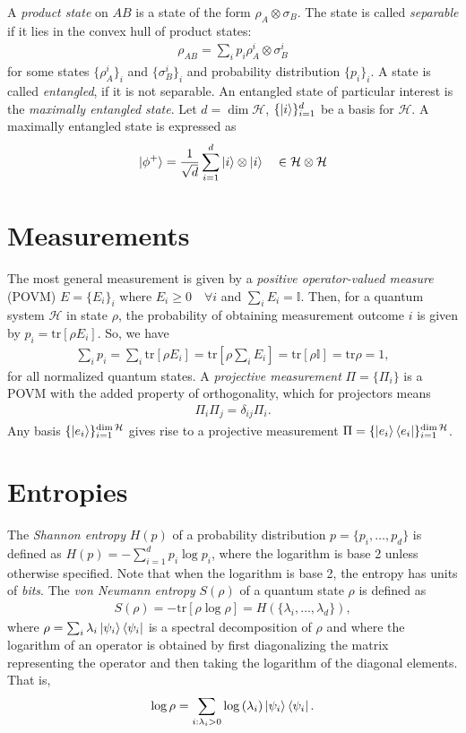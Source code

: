 \documentclass[../../note.tex]{subfiles}
\begin{document}
A \textit{product state} on $AB$ is a state of the form $\rho_A \otimes \sigma_B$. The state is called \textit{separable} if it lies in the convex hull of product states: 
\begin{align}
    \rho_{AB} = \sum_{i} p_i \rho_A^i \otimes \sigma_B^i
\end{align}
for some states $\{\rho_A^i\}_i$ and $\{\sigma_B^i\}_i$ and  probability distribution $\{p_i\}_i$. A state is called \textit{entangled}, if it is not separable. An entangled state of particular interest is the \textit{maximally entangled state}. Let $d=\dim\mathcal{H}$, $\{\ket{i}\}_{i=1}^d$ be a basis for $\mathcal{H}$. A maximally entangled state is expressed as
\begin{align}
    \ket{\phi^+} = \frac{1}{\sqrt{d}} \sum_{i=1}^d \ket{i}\otimes \ket{i} \quad \in \mathcal{H}\otimes \mathcal{H}
\end{align}
\section{Measurements}
The most general measurement is given by a \textit{positive operator-valued measure} (POVM) $E=\{E_i\}_i$ where $E_i \geq 0 \quad \forall i$ and $\sum_i E_i = \mathbb{I}$. Then, for a quantum system $\mathcal{H}$ in state $\rho$, the probability of obtaining measurement outcome $i$ is given by $p_i = \text{tr}[\rho E_i]$. So, we have 
\begin{align}
    \sum_i p_i = \sum_i \text{tr}[\rho E_i] = \text{tr}\left[\rho \sum_i E_ i\right] = \text{tr}[\rho \mathbb{I}] = \text{tr}\rho = 1,
\end{align}
for all normalized quantum states. A \textit{projective measurement} $\Pi =\{\Pi_i \}$ is a POVM with the added property of orthogonality, which for projectors means
\begin{align}
    \Pi_i \Pi_j =\delta_{ij} \Pi_i.
\end{align}
Any basis $\{\ket{e_i}\}^{\dim\mathcal{H}}_{i=1}$ gives rise to a projective measurement $\Pi=\{\ket{e_i}\bra{e_i}\}_{i=1}^{\dim\mathcal{H}}$.
\section{Entropies}
The \textit{Shannon entropy} $H(p)$ of a probability distribution $p=\{p_i, \dots, p_d\}$ is defined as $H(p)=-\sum_{i=1}^{d}p_i \log{p_i}$, where the logarithm is base 2 unless otherwise specified. Note that when the logarithm is base 2, the entropy has units of \textit{bits}. The \textit{von Neumann entropy} $S(\rho)$ of a quantum state $\rho$ is defined as 
\begin{align}
    S(\rho) = -\text{tr}\left[\rho \log \rho\right] = H(\{\lambda_i, \dots, \lambda_d\}),
\end{align}
where $\rho=\sum_i \lambda_i \ket{\psi_i}\bra{\psi_i}$ is a spectral decomposition of $\rho$ and where the logarithm of an operator is obtained by first diagonalizing the matrix representing the operator and then taking the logarithm of the diagonal elements. That is,
\begin{align}
    \log{\rho} = \sum_{i:\lambda_i >0} \log{(\lambda_i)} \ket{\psi_i}\bra{\psi_i}.
\end{align}
\end{document}
